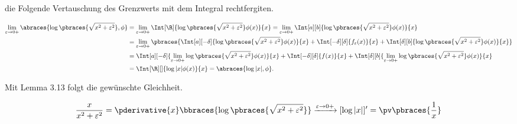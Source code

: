 \begin{solution}
die Folgende Vertauschung des Grenzwerts mit dem Integral rechtfergiten.

\begin{align*}
    \lim_{\varepsilon \to 0+}
    \abraces{\log \pbraces{\sqrt{x^2 + \varepsilon^2}}, \phi}
    & =
    \lim_{\varepsilon \to 0+}
    \Int[\R]{\log\pbraces{\sqrt{x^2 + \varepsilon^2}} \phi(x)}{x}
    =
    \lim_{\varepsilon \to 0+}
    \Int[a][b]{\log\pbraces{\sqrt{x^2 + \varepsilon^2}} \phi(x)}{x} \\
    & =
    \lim_{\varepsilon \to 0+}
    \pbraces
    {
        \Int[a][-\delta]{\log\pbraces{\sqrt{x^2 + \varepsilon^2}} \phi(x)}{x}
        +
        \Int[-\delta][\delta]{f_\varepsilon(x)}{x}
        +
        \Int[\delta][b]{\log\pbraces{\sqrt{x^2 + \varepsilon^2}} \phi(x)}{x}
    } \\
    & =
    \Int[a][-\delta]
    {
        \lim_{\varepsilon \to 0+}
        \log\pbraces{\sqrt{x^2 + \varepsilon^2}} \phi(x)
    }{x}
    +
    \Int[-\delta][\delta]{f(x)}{x}
    +
    \Int[\delta][b]
    {
        \lim_{\varepsilon \to 0+}
        \log\pbraces{\sqrt{x^2 + \varepsilon^2}} \phi(x)
    }{x} \\
    & =
    \Int[\R][]{\log|x| \phi(x)}{x}
    =
    \abraces{\log|x|, \phi}.
\end{align*}

Mit Lemma 3.13 folgt die gewünschte Gleichheit.

\begin{align*}
    \frac{x}{x^2 + \varepsilon^2}
    =
    \pderivative{x}
    \bbraces
    {
        \log
        \pbraces
        {
            \sqrt{x^2 + \varepsilon^2}
        }
    }
    \xrightarrow{\varepsilon \to 0+}
    [\log{|x|}]^\prime
    =
    \pv \pbraces{\frac{1}{x}}
\end{align*}

\end{solution}

